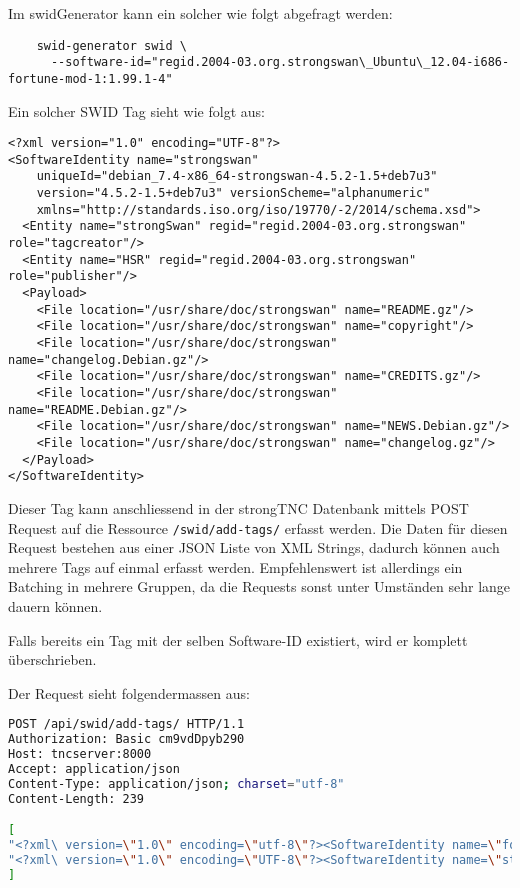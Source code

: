 \documentclass[10pt,a4paper]{scrartcl}
\begin{document}
Im swidGenerator kann ein solcher wie folgt abgefragt werden:

\begin{small}\begin{verbatim}
	swid-generator swid \
	  --software-id="regid.2004-03.org.strongswan\_Ubuntu\_12.04-i686-fortune-mod-1:1.99.1-4"
\end{verbatim}\end{small}

Ein solcher SWID Tag sieht wie folgt aus:

\begin{small}
\begin{verbatim}
<?xml version="1.0" encoding="UTF-8"?>
<SoftwareIdentity name="strongswan" 
	uniqueId="debian_7.4-x86_64-strongswan-4.5.2-1.5+deb7u3" 
	version="4.5.2-1.5+deb7u3" versionScheme="alphanumeric" 
	xmlns="http://standards.iso.org/iso/19770/-2/2014/schema.xsd">
  <Entity name="strongSwan" regid="regid.2004-03.org.strongswan" role="tagcreator"/>
  <Entity name="HSR" regid="regid.2004-03.org.strongswan" role="publisher"/>
  <Payload>
    <File location="/usr/share/doc/strongswan" name="README.gz"/>
    <File location="/usr/share/doc/strongswan" name="copyright"/>
    <File location="/usr/share/doc/strongswan" name="changelog.Debian.gz"/>
    <File location="/usr/share/doc/strongswan" name="CREDITS.gz"/>
    <File location="/usr/share/doc/strongswan" name="README.Debian.gz"/>
    <File location="/usr/share/doc/strongswan" name="NEWS.Debian.gz"/>
    <File location="/usr/share/doc/strongswan" name="changelog.gz"/>
  </Payload>
</SoftwareIdentity>
\end{verbatim}
\end{small}

Dieser Tag kann anschliessend in der strongTNC Datenbank mittels POST Request
auf die Ressource \texttt{/swid/add-tags/} erfasst werden. Die Daten für diesen
Request bestehen aus einer JSON Liste von XML Strings, dadurch können auch
mehrere Tags auf einmal erfasst werden. Empfehlenswert ist allerdings ein
Batching in mehrere Gruppen, da die Requests sonst unter Umständen sehr lange
dauern können. 

Falls bereits ein Tag mit der selben Software-ID existiert, wird er komplett
überschrieben.

\pagebreak
Der Request sieht folgendermassen aus:
\begin{small}\begin{lstlisting}[language=BASH]
POST /api/swid/add-tags/ HTTP/1.1
Authorization: Basic cm9vdDpyb290
Host: tncserver:8000
Accept: application/json
Content-Type: application/json; charset="utf-8"
Content-Length: 239

[
"<?xml\ version=\"1.0\" encoding=\"utf-8\"?><SoftwareIdentity name=\"fortune-mod\"...",
"<?xml\ version=\"1.0\" encoding=\"UTF-8\"?><SoftwareIdentity name=\"strongswan\"..."
]
\end{lstlisting}\end{small}
\end{document}
